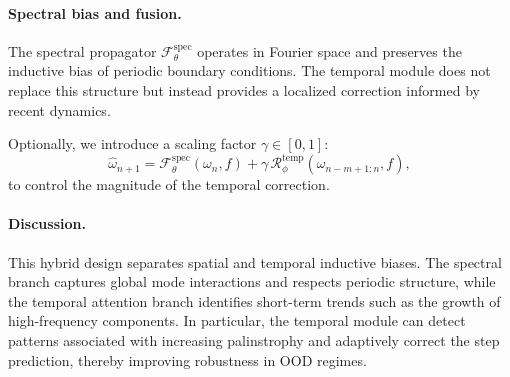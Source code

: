 \documentclass[11pt]{article}
\begin{document}
\paragraph{Spectral bias and fusion.}
The spectral propagator $\mathcal{F}_{\theta}^{\mathrm{spec}}$ operates in Fourier space and preserves the inductive bias of periodic boundary conditions. The temporal module does not replace this structure but instead provides a localized correction informed by recent dynamics.

Optionally, we introduce a scaling factor $\gamma \in [0,1]$:
\begin{equation}
\widehat{\omega}_{n+1}
=
\mathcal{F}_{\theta}^{\mathrm{spec}}(\omega_n, f)
+
\gamma \, \mathcal{R}_{\phi}^{\mathrm{temp}}(\omega_{n-m+1:n}, f),
\end{equation}
to control the magnitude of the temporal correction.

\paragraph{Discussion.}
This hybrid design separates spatial and temporal inductive biases. The spectral branch captures global mode interactions and respects periodic structure, while the temporal attention branch identifies short-term trends such as the growth of high-frequency components. In particular, the temporal module can detect patterns associated with increasing palinstrophy and adaptively correct the step prediction, thereby improving robustness in OOD regimes.

\newpage



\end{document}
